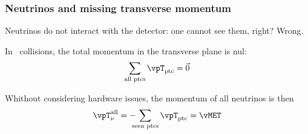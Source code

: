 \begin{frame}
\frametitle{Neutrinos and missing transverse momentum}

\manip Neutrinos do not interact with the detector: one cannot see them, right? \pause Wrong.

\manip In \proton\proton\ collisions, the total momentum in the transverse plane is nul:
\begin{equation*}
\sum_\text{all ptcs} \vpT_\text{ptc} = \vec{0}
\end{equation*}

\pause
\manip Whithout considering hardware issues, the momentum of all neutrinos is then
\begin{equation*}
\vpT_\nu^\text{all} = - \!\!\!\! \sum_\text{seen ptcs} \vpT_\text{ptc} = \vMET
\end{equation*}

\end{frame}

